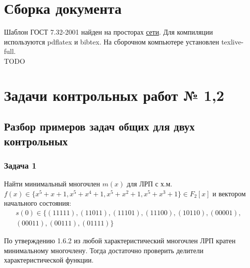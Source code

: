 \documentclass[utf8x, 14pt]{G7-32} %
\begin{document}



\chapter{Сборка документа}
\label{cha:design}
Шаблон ГОСТ 7.32-2001 найден на просторах \href{https://github.com/latex-g7-32/latex-g7-32/tree/master/tex}{сети}.
Для компиляции используются pdflatex и bibtex. На сборочном компьютере установлен texlive-full.
\\TODO

\mainmatter %

\chapter{Задачи контрольных работ № 1,2}
\section{Разбор примеров задач общих для двух контрольных}
\subsection{Задача 1}
Найти минимальный многочлен $m(x)$ для ЛРП с х.м. $f(x)\in\{x^5+x+1, x^5+x^4+1, x^5+x^2+1, x^5+x^3+1\}\in F_2[x]$ и вектором начального состояния: $$\begin{aligned}s(0)\in\{(11111), (11011), (11101), (11100), (10110), (00001), \\ (00011), (00111), (01111)\}\end{aligned}$$

По утверждению 1.6.2 из \cite{hse:Teoria_Gener} любой характеристический многочлен ЛРП кратен минимальному многочлену. Тогда достаточно проверить делители характеристической функции.
\end{document}
